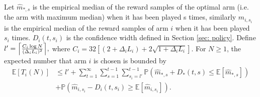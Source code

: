 \begin{lemma}
\label{lemma: upper bound of expected number of draws}
Let $\hat{m}_{*, s}$ is the empirical median of the reward samples of the optimal arm (i.e. the arm with maximum median) when it has been played s times, similarly $\hat{m}_{i, s_i}$ is the empirical median of the reward samples of arm $i$ when it has been played $s_i$ times. $D_i(t, s_i)$ is the confidence width defined in Section \ref{sec: policy}. 
Define $l' = \Bigl\lceil \frac{C_{i} \log N}{(\Delta_i L_{i})^2}  \Bigr\rceil,$ where $ C_{i} = 32 \left[(2 + \Delta_i L_{i}) + 2\sqrt{ 1 + \Delta_i L_{i}}\right]$.
 For $N \geq 1$, the expected number that arm $i$ is chosen is bounded by
\begin{align}
\label{equ: proof upper bound of expected number of draws}
    \mathbb{E}[T_i\left(N\right)] &\leq l' + \sum_{t = 1}^\infty \sum_{s = 1}^{t-1} \sum_{s_i = l'}^{t-1} \mathbb{P}\left(\hat{m}_{*, s} +  D_*(t, s) \leq  \mathbb{E}[\hat{m}_{*, s}]\right)\nonumber \\ & + \mathbb{P}\left(\hat{m}_{i, s_i} -  D_i(t, s_i) \geq \mathbb{E}[\hat{m}_{i, s_i}]\right).
\end{align}
\end{lemma}

